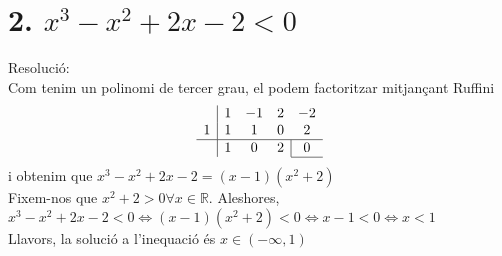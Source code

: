 \section*{2. $x^3 - x^2 + 2x - 2 < 0$}
Resolució: \\
Com tenim un polinomi de tercer grau, el podem factoritzar mitjançant Ruffini
$$\begin{array}{c|cccc}
& 1 & -1 & 2 & -2 \\
1 & 1 & 1 & 0 & 2 \\
\hline
& 1 & 0 & 2 & \multicolumn{1}{|c}{0} \\
\cline{5-5}
\end{array}$$
i obtenim que $x^3 - x^2 + 2x - 2 = (x - 1)(x^2 + 2)$ \\
Fixem-nos que $x^2 + 2 > 0 \forall x \in \mathbb{R}$. Aleshores, $x^3 - x^2 + 2x - 2 < 0 \Leftrightarrow (x - 1)(x^2 + 2)<0 \Leftrightarrow x - 1 < 0 \Leftrightarrow x < 1$ \\
Llavors, la solució a l'inequació és $x \in (-\infty, 1)$
